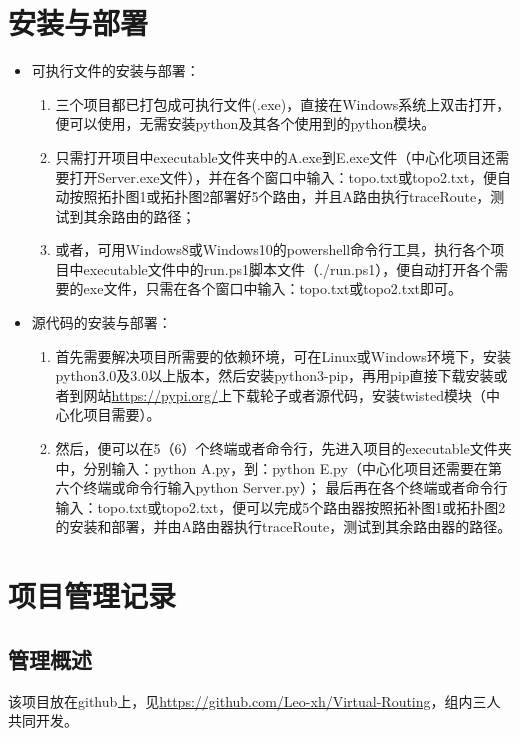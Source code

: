 \documentclass[15pt]{ctexart}
\begin{document}
\section{安装与部署} %
\label{sec:安装与部署}
	\begin{itemize}
		\item 可执行文件的安装与部署：
			\begin{enumerate}
				\item 三个项目都已打包成可执行文件(.exe)，直接在Windows系统上双击打开，便可以使用，无需安装python及其各个使用到的python模块。
				\item 只需打开项目中executable文件夹中的A.exe到E.exe文件（中心化项目还需要打开Server.exe文件），并在各个窗口中输入：topo.txt或topo2.txt，便自动按照拓扑图1或拓扑图2部署好5个路由，并且A路由执行traceRoute，测试到其余路由的路径；
				\item 或者，可用Windows8或Windows10的powershell命令行工具，执行各个项目中executable文件中的run.ps1脚本文件（./run.ps1），便自动打开各个需要的exe文件，只需在各个窗口中输入：topo.txt或topo2.txt即可。
			\end{enumerate}
		\item 源代码的安装与部署：
			\begin{enumerate}
				\item 首先需要解决项目所需要的依赖环境，可在Linux或Windows环境下，安装python3.0及3.0以上版本，然后安装python3-pip，再用pip直接下载安装或者到网站\url{https://pypi.org/}上下载轮子或者源代码，安装twisted模块（中心化项目需要）。
				\item 然后，便可以在5（6）个终端或者命令行，先进入项目的executable文件夹中，分别输入：python A.py，到：python E.py（中心化项目还需要在第六个终端或命令行输入python Server.py）；
				最后再在各个终端或者命令行输入：topo.txt或topo2.txt，便可以完成5个路由器按照拓补图1或拓扑图2的安装和部署，并由A路由器执行traceRoute，测试到其余路由器的路径。
			\end{enumerate}
	\end{itemize}

\section{项目管理记录} %
\label{sec:项目管理记录}
	\subsection{管理概述} %
	\label{sub:管理概述}
		该项目放在github上，见\url{https://github.com/Leo-xh/Virtual-Routing}，组内三人共同开发。
\end{document}
